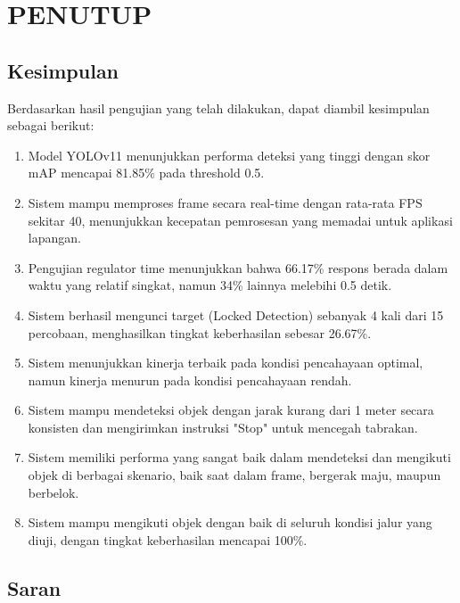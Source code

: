 \chapter{PENUTUP}
\label{chap:penutup}


\section{Kesimpulan}
\label{sec:kesimpulan}

Berdasarkan hasil pengujian yang telah dilakukan, dapat diambil kesimpulan sebagai berikut:

\begin{enumerate}[nolistsep]
  \item Model YOLOv11 menunjukkan performa deteksi yang tinggi dengan skor mAP mencapai 81.85\% pada threshold 0.5.
  \item Sistem mampu memproses frame secara real-time dengan rata-rata FPS sekitar 40, menunjukkan kecepatan pemrosesan yang memadai untuk aplikasi lapangan.
  \item Pengujian regulator time menunjukkan bahwa 66.17\% respons berada dalam waktu yang relatif singkat, namun 34\% lainnya melebihi 0.5 detik.
  \item Sistem berhasil mengunci target (Locked Detection) sebanyak 4 kali dari 15 percobaan, menghasilkan tingkat keberhasilan sebesar 26.67\%.
  \item Sistem menunjukkan kinerja terbaik pada kondisi pencahayaan optimal, namun kinerja menurun pada kondisi pencahayaan rendah.
  \item Sistem mampu mendeteksi objek dengan jarak kurang dari 1 meter secara konsisten dan mengirimkan instruksi "Stop" untuk mencegah tabrakan.
  \item Sistem memiliki performa yang sangat baik dalam mendeteksi dan mengikuti objek di berbagai skenario, baik saat dalam frame, bergerak maju, maupun berbelok.
  \item Sistem mampu mengikuti objek dengan baik di seluruh kondisi jalur yang diuji, dengan tingkat keberhasilan mencapai 100\%.

\end{enumerate}

\section{Saran}
\label{chap:saran}

